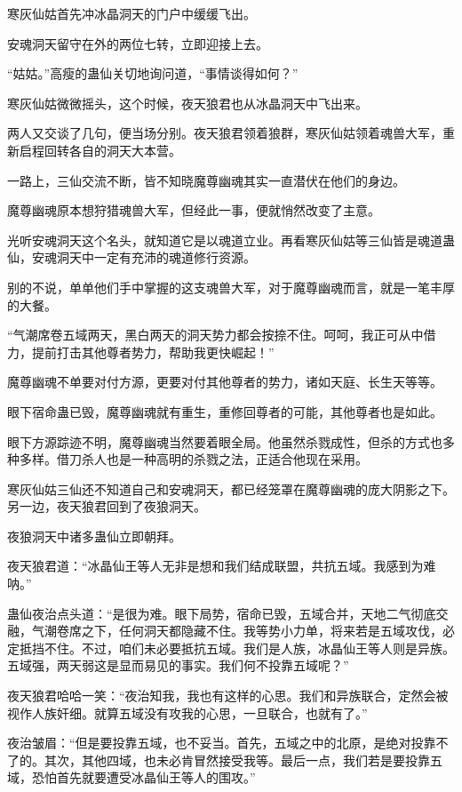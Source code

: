 
\begin{this_body}

寒灰仙姑首先冲冰晶洞天的门户中缓缓飞出。

安魂洞天留守在外的两位七转，立即迎接上去。

“姑姑。”高瘦的蛊仙关切地询问道，“事情谈得如何？”

寒灰仙姑微微摇头，这个时候，夜天狼君也从冰晶洞天中飞出来。

两人又交谈了几句，便当场分别。夜天狼君领着狼群，寒灰仙姑领着魂兽大军，重新启程回转各自的洞天大本营。

一路上，三仙交流不断，皆不知晓魔尊幽魂其实一直潜伏在他们的身边。

魔尊幽魂原本想狩猎魂兽大军，但经此一事，便就悄然改变了主意。

光听安魂洞天这个名头，就知道它是以魂道立业。再看寒灰仙姑等三仙皆是魂道蛊仙，安魂洞天中一定有充沛的魂道修行资源。

别的不说，单单他们手中掌握的这支魂兽大军，对于魔尊幽魂而言，就是一笔丰厚的大餐。

“气潮席卷五域两天，黑白两天的洞天势力都会按捺不住。呵呵，我正可从中借力，提前打击其他尊者势力，帮助我更快崛起！”

魔尊幽魂不单要对付方源，更要对付其他尊者的势力，诸如天庭、长生天等等。

眼下宿命蛊已毁，魔尊幽魂就有重生，重修回尊者的可能，其他尊者也是如此。

眼下方源踪迹不明，魔尊幽魂当然要着眼全局。他虽然杀戮成性，但杀的方式也多种多样。借刀杀人也是一种高明的杀戮之法，正适合他现在采用。

寒灰仙姑三仙还不知道自己和安魂洞天，都已经笼罩在魔尊幽魂的庞大阴影之下。另一边，夜天狼君回到了夜狼洞天。

夜狼洞天中诸多蛊仙立即朝拜。

夜天狼君道：“冰晶仙王等人无非是想和我们结成联盟，共抗五域。我感到为难呐。”

蛊仙夜治点头道：“是很为难。眼下局势，宿命已毁，五域合并，天地二气彻底交融，气潮卷席之下，任何洞天都隐藏不住。我等势小力单，将来若是五域攻伐，必定抵挡不住。不过，咱们未必要抵抗五域。我们是人族，冰晶仙王等人则是异族。五域强，两天弱这是显而易见的事实。我们何不投靠五域呢？”

夜天狼君哈哈一笑：“夜治知我，我也有这样的心思。我们和异族联合，定然会被视作人族奸细。就算五域没有攻我的心思，一旦联合，也就有了。”

夜治皱眉：“但是要投靠五域，也不妥当。首先，五域之中的北原，是绝对投靠不了的。其次，其他四域，也未必肯冒然接受我等。最后一点，我们若是要投靠五域，恐怕首先就要遭受冰晶仙王等人的围攻。”


\end{this_body}
